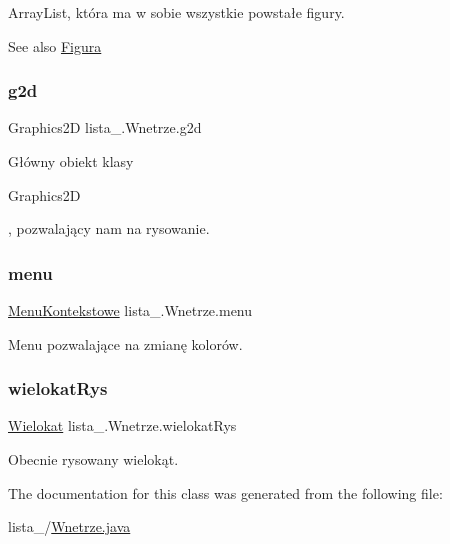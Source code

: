 Array\+List, która ma w sobie wszystkie powstałe figury. \begin{DoxySeeAlso}{See also}
\mbox{\hyperlink{interfacelista__5_1_1_figura}{Figura}} 
\end{DoxySeeAlso}
\mbox{\label{classlista__5_1_1_wnetrze_a7aa207b33c99ffe3b8f8e4a2f7e22632}} 
\subsubsection{\texorpdfstring{g2d}{g2d}}
{\footnotesize\ttfamily Graphics2D lista\+\_.\+Wnetrze.\+g2d\hspace{0.3cm}{\ttfamily [private]}}

Główny obiekt klasy
\begin{DoxyCode}
Graphics2D 
\end{DoxyCode}
 , pozwalający nam na rysowanie. \mbox{\label{classlista__5_1_1_wnetrze_a3b82cd912cfe874fd313ffc40687ddf6}} 
\subsubsection{\texorpdfstring{menu}{menu}}
{\footnotesize\ttfamily \mbox{\hyperlink{classlista__5_1_1_menu_kontekstowe}{Menu\+Kontekstowe}} lista\+\_.\+Wnetrze.\+menu\hspace{0.3cm}{\ttfamily [private]}}

Menu pozwalające na zmianę kolorów. \mbox{\label{classlista__5_1_1_wnetrze_a6f5256e1e24b7cc70ea083655a3e649b}} 
\subsubsection{\texorpdfstring{wielokat\+Rys}{wielokatRys}}
{\footnotesize\ttfamily \mbox{\hyperlink{classlista__5_1_1_wielokat}{Wielokat}} lista\+\_.\+Wnetrze.\+wielokat\+Rys\hspace{0.3cm}{\ttfamily [private]}}

Obecnie rysowany wielokąt. 

The documentation for this class was generated from the following file\+:\begin{DoxyCompactItemize}
\item 
lista\+\_/\mbox{\hyperlink{_wnetrze_8java}{Wnetrze.\+java}}\end{DoxyCompactItemize}
